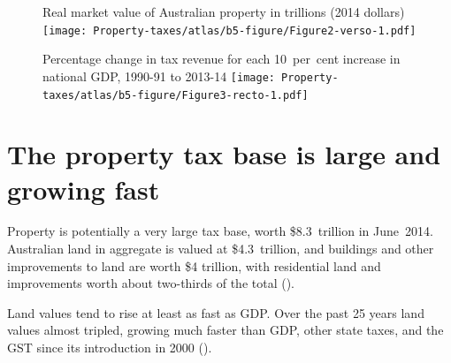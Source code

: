 \documentclass[twoside,english]{palatinob5ona4portrait}
\begin{document}
\begin{figure}
%
{Real market value of Australian property in trillions (2014 dollars)}%
\texttt{[image: Property-taxes/atlas/b5-figure/Figure2-verso-1.pdf]}
\end{figure}

\begin{figure}
\vspace{1.35\baselineskip} %
%
{Percentage change in tax revenue for each 10~per~cent increase in national GDP, 1990-91 to 2013-14}
\texttt{[image: Property-taxes/atlas/b5-figure/Figure3-recto-1.pdf]}


\end{figure}



\section{The property tax base is large and growing fast\label{sec:PROP-3-2}}
Property is potentially a very large tax base, worth \$8.3~trillion in June~2014. Australian land in aggregate is valued at \$4.3~trillion, and buildings and other improvements to land are worth \$4 trillion, with residential land and improvements worth about two-thirds of the total (). \enlargethispage{0.5\baselineskip} \enlargethispage*{0.5\baselineskip}



Land values tend to rise at least as fast as GDP\@. Over the past 25 years land values almost tripled, growing much faster than GDP, other state taxes, and the GST since its introduction in 2000 ().  
\end{document}
